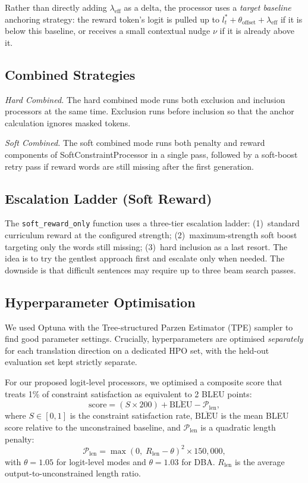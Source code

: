 \documentclass{tlp}
\begin{document}
Rather than directly adding $\lambda_{\text{eff}}$ as a delta, the processor uses a
\emph{target baseline} anchoring strategy: the reward token's logit is pulled up to
$l_t^{*} + \theta_{\text{offset}} + \lambda_{\text{eff}}$ if it is below this
baseline, or receives a small contextual nudge $\nu$ if it is already above it.

\subsection{Combined Strategies}

\textit{Hard Combined.} The hard combined mode runs both exclusion and inclusion
processors at the same time. Exclusion runs before inclusion so that the anchor
calculation ignores masked tokens.

\textit{Soft Combined.} The soft combined mode runs both penalty and reward
components of SoftConstraintProcessor in a single pass, followed by a soft-boost
retry pass if reward words are still missing after the first generation.

\subsection{Escalation Ladder (Soft Reward)}

The \texttt{soft\_reward\_only} function uses a three-tier escalation ladder:
(1)~standard curriculum reward at the configured strength; (2)~maximum-strength soft
boost targeting only the words still missing; (3)~hard inclusion as a last resort.
The idea is to try the gentlest approach first and escalate only when needed. The
downside is that difficult sentences may require up to three beam search passes.

\subsection{Hyperparameter Optimisation}

We used Optuna \citep{akiba2019optuna} with the Tree-structured Parzen Estimator
(TPE) sampler to find good parameter settings. Crucially, hyperparameters are
optimised \emph{separately} for each translation direction on a dedicated HPO set,
with the held-out evaluation set kept strictly separate.

For our proposed logit-level processors, we optimised a composite score that treats
1\% of constraint satisfaction as equivalent to 2 BLEU points:
\begin{equation}
    \text{score} = (S \times 200) + \overline{\text{BLEU}} - \mathcal{P}_{\text{len}},
    \label{eq:obj}
\end{equation}
where $S \in [0, 1]$ is the constraint satisfaction rate, $\overline{\text{BLEU}}$
is the mean BLEU score relative to the unconstrained baseline, and
$\mathcal{P}_{\text{len}}$ is a quadratic length penalty:
\begin{equation}
    \mathcal{P}_{\text{len}} = \max(0,\; R_{\text{len}} - \theta)^2 \times 150{,}000,
    \label{eq:lenpen}
\end{equation}
with $\theta = 1.05$ for logit-level modes and $\theta = 1.03$ for DBA.
$R_{\text{len}}$ is the average output-to-unconstrained length ratio.
\end{document}
